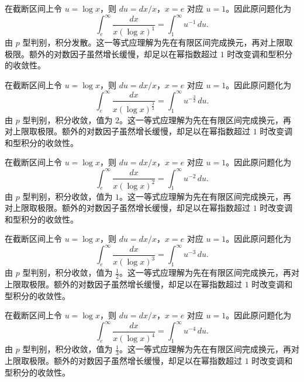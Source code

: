 \documentclass[12pt,fontset=fandol]{ctexart}
\begin{document}
\begin{solve}\label{ans:c19q15}
在截断区间上令 $u=\log x$，则 $du=dx/x$，$x=e$ 对应 $u=1$。因此原问题化为
\[
\int_e^\infty\frac{dx}{x(\log x)^{1}}=\int_1^\infty u^{-1}\,du.
\]
由 $p$ 型判别，积分发散。这一等式应理解为先在有限区间完成换元，再对上限取极限。额外的对数因子虽然增长缓慢，却足以在幂指数超过 $1$ 时改变调和型积分的收敛性。
\end{solve}

\begin{solve}\label{ans:c19q16}
在截断区间上令 $u=\log x$，则 $du=dx/x$，$x=e$ 对应 $u=1$。因此原问题化为
\[
\int_e^\infty\frac{dx}{x(\log x)^{\frac{3}{2}}}=\int_1^\infty u^{-\frac{3}{2}}\,du.
\]
由 $p$ 型判别，积分收敛，值为 $2$。这一等式应理解为先在有限区间完成换元，再对上限取极限。额外的对数因子虽然增长缓慢，却足以在幂指数超过 $1$ 时改变调和型积分的收敛性。
\end{solve}

\begin{solve}\label{ans:c19q17}
在截断区间上令 $u=\log x$，则 $du=dx/x$，$x=e$ 对应 $u=1$。因此原问题化为
\[
\int_e^\infty\frac{dx}{x(\log x)^{2}}=\int_1^\infty u^{-2}\,du.
\]
由 $p$ 型判别，积分收敛，值为 $1$。这一等式应理解为先在有限区间完成换元，再对上限取极限。额外的对数因子虽然增长缓慢，却足以在幂指数超过 $1$ 时改变调和型积分的收敛性。
\end{solve}

\begin{solve}\label{ans:c19q18}
在截断区间上令 $u=\log x$，则 $du=dx/x$，$x=e$ 对应 $u=1$。因此原问题化为
\[
\int_e^\infty\frac{dx}{x(\log x)^{3}}=\int_1^\infty u^{-3}\,du.
\]
由 $p$ 型判别，积分收敛，值为 $\frac{1}{2}$。这一等式应理解为先在有限区间完成换元，再对上限取极限。额外的对数因子虽然增长缓慢，却足以在幂指数超过 $1$ 时改变调和型积分的收敛性。
\end{solve}

\begin{solve}\label{ans:c19q19}
在截断区间上令 $u=\log x$，则 $du=dx/x$，$x=e$ 对应 $u=1$。因此原问题化为
\[
\int_e^\infty\frac{dx}{x(\log x)^{4}}=\int_1^\infty u^{-4}\,du.
\]
由 $p$ 型判别，积分收敛，值为 $\frac{1}{3}$。这一等式应理解为先在有限区间完成换元，再对上限取极限。额外的对数因子虽然增长缓慢，却足以在幂指数超过 $1$ 时改变调和型积分的收敛性。
\end{solve}
\end{document}
